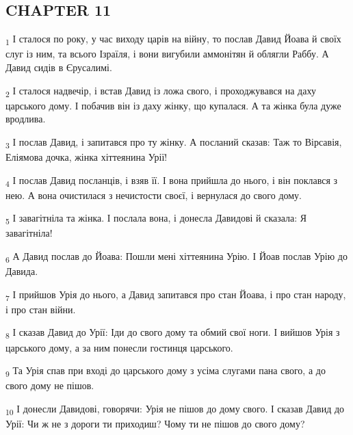 \subsection{CHAPTER 11}
\begin{tcolorbox}
\textsubscript{1} І сталося по року, у час виходу царів на війну, то послав Давид Йоава й своїх слуг із ним, та всього Ізраїля, і вони вигубили аммонітян й облягли Раббу. А Давид сидів в Єрусалимі.
\end{tcolorbox}
\begin{tcolorbox}
\textsubscript{2} І сталося надвечір, і встав Давид із ложа свого, і проходжувався на даху царського дому. І побачив він із даху жінку, що купалася. А та жінка була дуже вродлива.
\end{tcolorbox}
\begin{tcolorbox}
\textsubscript{3} І послав Давид, і запитався про ту жінку. А посланий сказав: Таж то Вірсавія, Еліямова дочка, жінка хіттеянина Урії!
\end{tcolorbox}
\begin{tcolorbox}
\textsubscript{4} І послав Давид посланців, і взяв її. І вона прийшла до нього, і він поклався з нею. А вона очистилася з нечистости своєї, і вернулася до свого дому.
\end{tcolorbox}
\begin{tcolorbox}
\textsubscript{5} І завагітніла та жінка. І послала вона, і донесла Давидові й сказала: Я завагітніла!
\end{tcolorbox}
\begin{tcolorbox}
\textsubscript{6} А Давид послав до Йоава: Пошли мені хіттеянина Урію. І Йоав послав Урію до Давида.
\end{tcolorbox}
\begin{tcolorbox}
\textsubscript{7} І прийшов Урія до нього, а Давид запитався про стан Йоава, і про стан народу, і про стан війни.
\end{tcolorbox}
\begin{tcolorbox}
\textsubscript{8} І сказав Давид до Урії: Іди до свого дому та обмий свої ноги. І вийшов Урія з царського дому, а за ним понесли гостинця царського.
\end{tcolorbox}
\begin{tcolorbox}
\textsubscript{9} Та Урія спав при вході до царського дому з усіма слугами пана свого, а до свого дому не пішов.
\end{tcolorbox}
\begin{tcolorbox}
\textsubscript{10} І донесли Давидові, говорячи: Урія не пішов до дому свого. І сказав Давид до Урії: Чи ж не з дороги ти приходиш? Чому ти не пішов до свого дому?
\end{tcolorbox}
